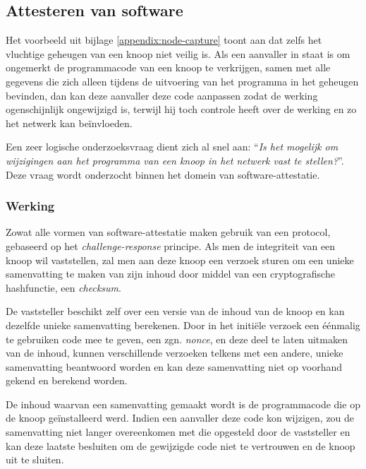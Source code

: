 
\subsection{Attesteren van software}
\label{subsection:attestation}

Het voorbeeld uit bijlage \ref{appendix:node-capture} toont aan dat zelfs het
vluchtige geheugen van een knoop niet veilig is. Als een aanvaller in staat is
om ongemerkt de programmacode van een knoop te verkrijgen, samen met alle
gegevens die zich alleen tijdens de uitvoering van het programma in het
geheugen bevinden, dan kan deze aanvaller deze code aanpassen zodat de werking
ogenschijnlijk ongewijzigd is, terwijl hij toch controle heeft over de werking
en zo het netwerk kan be\"invloeden.

Een zeer logische onderzoeksvraag dient zich al snel aan: ``\emph{Is het
mogelijk om wijzigingen aan het programma van een knoop in het netwerk vast te
stellen?}''. Deze vraag wordt onderzocht binnen het domein van
software-attestatie.

\subsubsection*{Werking}

Zowat alle vormen van software-attestatie maken gebruik van een protocol,
gebaseerd op het \emph{challenge-response} principe. Als men de integriteit van
een knoop wil vaststellen, zal men aan deze knoop een verzoek sturen om een
unieke samenvatting te maken van zijn inhoud door middel van een
cryptografische hashfunctie, een \emph{checksum}.

De vaststeller beschikt zelf over een versie van de inhoud van de knoop en kan
dezelfde unieke samenvatting berekenen. Door in het initi\"ele verzoek een
\'e\'enmalig te gebruiken code mee te geven, een zgn. \emph{nonce}, en deze
deel te laten uitmaken van de inhoud, kunnen verschillende verzoeken telkens
met een andere, unieke samenvatting beantwoord worden en kan deze samenvatting
niet op voorhand gekend en berekend worden.

De inhoud waarvan een samenvatting gemaakt wordt is de programmacode die op de
knoop ge\"installeerd werd. Indien een aanvaller deze code kon wijzigen, zou de
samenvatting niet langer overeenkomen met die opgesteld door de vaststeller en
kan deze laatste besluiten om de gewijzigde code niet te vertrouwen en de knoop
uit te sluiten.

